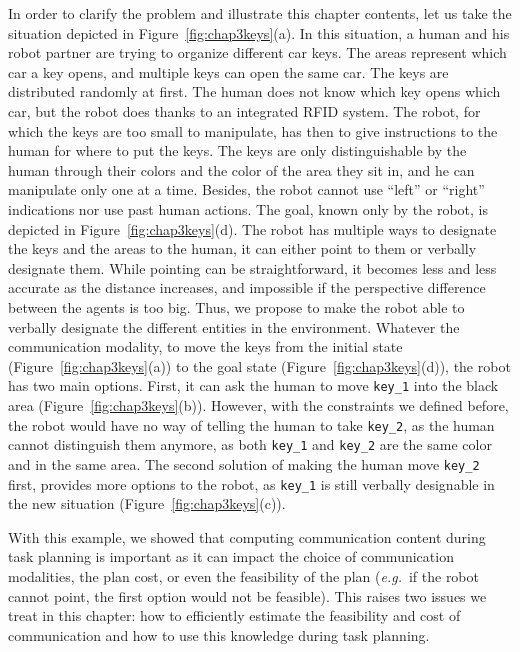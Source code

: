 \documentclass[a4paper,11pt,twoside]{StyleThese}
\begin{document}
In order to clarify the problem and illustrate this chapter contents, let us take the situation depicted in Figure~\ref{fig:chap3keys}(a). In this situation, a human and his robot partner are trying to organize different car keys. The areas represent which car a key opens, and multiple keys can open the same car. The keys are distributed randomly at first. The human does not know which key opens which car, but the robot does thanks to an integrated RFID system. The robot, for which the keys are too small to manipulate, has then to give instructions to the human for where to put the keys. The keys are only distinguishable by the human through their colors and the color of the area they sit in, and he can manipulate only one at a time. Besides, the robot cannot use ``left'' or ``right'' indications nor use past human actions.
The goal, known only by the robot, is depicted in Figure~\ref{fig:chap3keys}(d). The robot has multiple ways to designate the keys and the areas to the human, it can either point to them or verbally designate them. While pointing can be straightforward, it becomes less and less accurate as the distance increases, and impossible if the perspective difference between the agents is too big. Thus, we propose to make the robot able to verbally designate the different entities in the environment.
Whatever the communication modality, to move the keys from the initial state (Figure~\ref{fig:chap3keys}(a)) to the goal state (Figure~\ref{fig:chap3keys}(d)), the robot has two main options. First, it can ask the human to move \verb'key_1' into the black area (Figure~\ref{fig:chap3keys}(b)). However, with the constraints we defined before, the robot would have no way of telling the human to take \verb'key_2', as the human cannot distinguish them anymore, as both \verb'key_1' and \verb'key_2' are the same color and in the same area. The second solution of making the human move \verb'key_2' first, provides more options to the robot, as \verb'key_1' is still verbally designable in the new situation (Figure~\ref{fig:chap3keys}(c)).

With this example, we showed that computing communication content during task planning is important as it can impact the choice of communication modalities, the plan cost, or even the feasibility of the plan (\textit{e.g.}~if the robot cannot point, the first option would not be feasible). This raises two issues we treat in this chapter: how to efficiently estimate the feasibility and cost of communication and how to use this knowledge during task planning.
\end{document}
